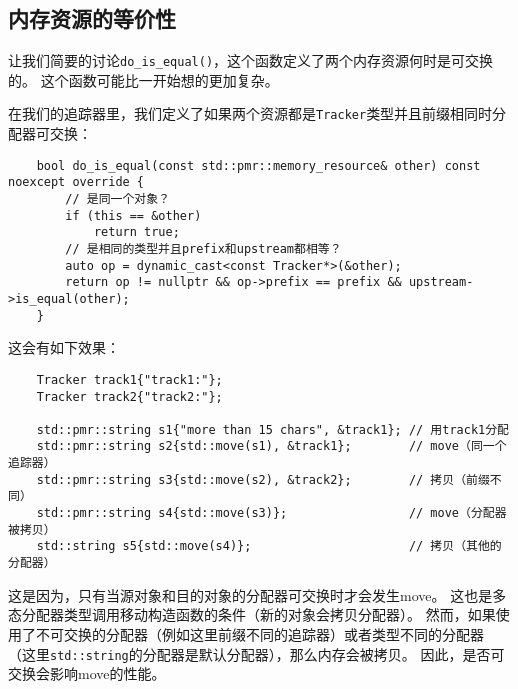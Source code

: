 \subsection{内存资源的等价性}
让我们简要的讨论\texttt{do\_is\_equal()}，这个函数定义了两个内存资源何时是可交换的。
这个函数可能比一开始想的更加复杂。

在我们的追踪器里，我们定义了如果两个资源都是\texttt{Tracker}类型并且前缀相同时分配器可交换：
\begin{lstlisting}
    bool do_is_equal(const std::pmr::memory_resource& other) const noexcept override {
        // 是同一个对象？
        if (this == &other)
            return true;
        // 是相同的类型并且prefix和upstream都相等？
        auto op = dynamic_cast<const Tracker*>(&other);
        return op != nullptr && op->prefix == prefix && upstream->is_equal(other);
    }
\end{lstlisting}
这会有如下效果：
\begin{lstlisting}
    Tracker track1{"track1:"};
    Tracker track2{"track2:"};

    std::pmr::string s1{"more than 15 chars", &track1}; // 用track1分配
    std::pmr::string s2{std::move(s1), &track1};        // move（同一个追踪器）
    std::pmr::string s3{std::move(s2), &track2};        // 拷贝（前缀不同）
    std::pmr::string s4{std::move(s3)};                 // move（分配器被拷贝）
    std::string s5{std::move(s4)};                      // 拷贝（其他的分配器）
\end{lstlisting}
这是因为，只有当源对象和目的对象的分配器可交换时才会发生move。
这也是多态分配器类型调用移动构造函数的条件（新的对象会拷贝分配器）。
然而，如果使用了不可交换的分配器（例如这里前缀不同的追踪器）或者类型不同的分配器
（这里\texttt{std::string}的分配器是默认分配器），那么内存会被拷贝。
因此，是否可交换会影响move的性能。

